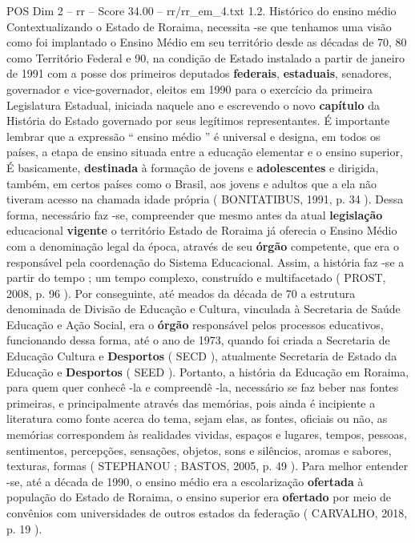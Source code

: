 \begin{textsample}{POS Dim 2 – rr – Score 34.00 – rr/rr\_em\_4.txt}  \label{ex:f2_pos_104}
1.2.
Histórico do ensino médio Contextualizando o Estado de Roraima, necessita -se que tenhamos uma visão como foi implantado o Ensino Médio em seu território desde as décadas de 70, 80 como Território Federal e 90, na condição de Estado instalado a partir de janeiro de 1991 com a posse dos primeiros deputados \textbf{federais}, \textbf{estaduais}, senadores, governador e vice-governador, eleitos em 1990 para o exercício da primeira Legislatura Estadual, iniciada naquele ano e escrevendo o novo \textbf{capítulo} da História do Estado governado por seus legítimos representantes.
É importante lembrar que a expressão “ ensino médio ” é universal e designa, em todos os países, a etapa de ensino situada entre a educação elementar e o ensino superior, É basicamente, \textbf{destinada} à formação de jovens e \textbf{adolescentes} e dirigida, também, em certos países como o Brasil, aos jovens e adultos que a ela não tiveram acesso na chamada idade própria ( BONITATIBUS, 1991, p. 34 ).
Dessa forma, necessário faz -se, compreender que mesmo antes da atual \textbf{legislação} educacional \textbf{vigente} o território Estado de Roraima já oferecia o Ensino Médio com a denominação legal da época, através de seu \textbf{órgão} competente, que era o responsável pela coordenação do Sistema Educacional.
Assim, a história faz -se a partir do tempo ; um tempo complexo, construído e multifacetado ( PROST, 2008, p. 96 ).
Por conseguinte, até meados da década de 70 a estrutura denominada de Divisão de Educação e Cultura, vinculada à Secretaria de Saúde Educação e Ação Social, era o \textbf{órgão} responsável pelos processos educativos, funcionando dessa forma, até o ano de 1973, quando foi criada a Secretaria de Educação Cultura e \textbf{Desportos} ( SECD ), atualmente Secretaria de Estado da Educação e \textbf{Desportos} ( SEED ).
Portanto, a história da Educação em Roraima, para quem quer conhecê -la e compreendê -la, necessário se faz beber nas fontes primeiras, e principalmente através das memórias, pois ainda é incipiente a literatura como fonte acerca do tema, sejam elas, as fontes, oficiais ou não, as memórias correspondem às realidades vividas, espaços e lugares, tempos, pessoas, sentimentos, percepções, sensações, objetos, sons e silêncios, aromas e sabores, texturas, formas ( STEPHANOU ; BASTOS, 2005, p. 49 ).
Para melhor entender -se, até a década de 1990, o ensino médio era a escolarização \textbf{ofertada} à população do Estado de Roraima, o ensino superior era \textbf{ofertado} por meio de convênios com universidades de outros estados da federação ( CARVALHO, 2018, p. 19 ).

\end{textsample}
